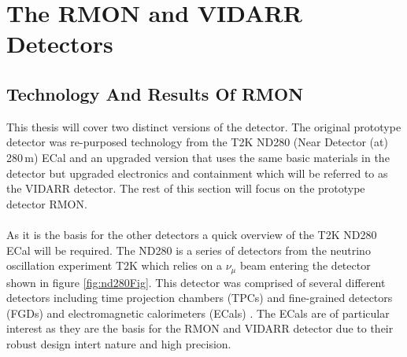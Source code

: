 
\ifpdf
    \graphicspath{{Chapter3/Figs/Raster/}{Chapter3/Figs/PDF/}{Chapter3/Figs/}}
\else
    \graphicspath{{Chapter3/Figs/Vector/}{Chapter3/Figs/}}
\fi


\chapter{The RMON and VIDARR Detectors}\label{Chp:ThePrototypeDetector}

\section{Technology And Results Of RMON}
This thesis will cover two distinct versions of the detector. The original prototype detector was re-purposed technology from the T2K ND280 (Near Detector (at) 280\,m) ECal \cite{Allan_2013} and an upgraded version that uses the same basic materials in the detector but upgraded electronics and containment which will be referred to as the VIDARR detector. The rest of this section will focus on the prototype detector RMON.
\\\\As it is the basis for the other detectors a quick overview of the T2K ND280 ECal will be required. The ND280 is a series of detectors from the neutrino oscillation experiment T2K which relies on a $\nu_\mu$ beam entering the detector shown in figure \ref{fig:nd280Fig}. This detector was comprised of several different detectors including time projection chambers (TPCs) and fine-grained detectors (FGDs) and electromagnetic calorimeters (ECals) \cite{Allan_2013}. The ECals are of particular interest as they are the basis for the RMON and VIDARR detector due to their robust design intert nature and high precision.  


